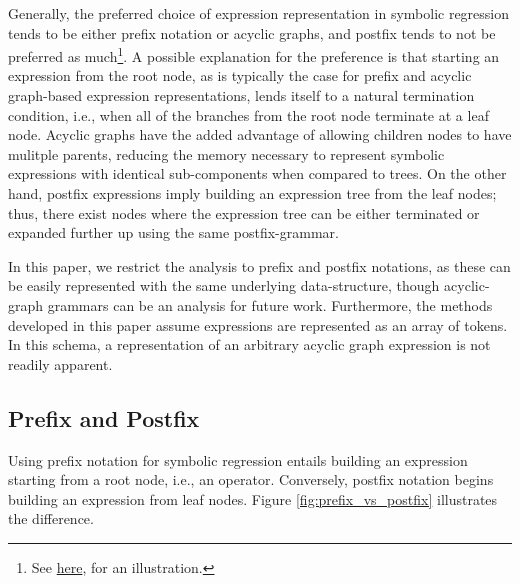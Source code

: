 \documentclass[runningheads]{llncs}
\begin{document}
Generally, the preferred choice of expression representation in symbolic regression tends to be either prefix notation or acyclic graphs, and postfix tends to not be preferred as much\footnote{See \href{https://github.com/edfink234/Alpha-Zero-Symbolic-Regression/blob/3f384098ef19681f2de23410cc1375b01ddb28b8/Figure_1/pub_freqs.pdf}{here}, for an illustration.}. A possible explanation for the preference is that starting an expression from the root node, as is typically the case for prefix and acyclic graph-based expression representations, lends itself to a natural termination condition, i.e., when all of the branches from the root node terminate at a leaf node. Acyclic graphs have the added advantage of allowing children nodes to have mulitple parents, reducing the memory necessary to represent symbolic expressions with identical sub-components when compared to trees. On the other hand, postfix expressions imply building an expression tree from the leaf nodes; thus, there exist nodes where the expression tree can be either terminated or expanded further up using the same postfix-grammar. 

In this paper, we restrict the analysis to prefix and postfix notations, as these can be easily represented with the same underlying data-structure, though acyclic-graph grammars can be an analysis for future work. Furthermore, the methods developed in this paper assume expressions are represented as an array of tokens. In this schema, a representation of an arbitrary acyclic graph expression is not readily apparent.


\subsection{Prefix and Postfix}
Using prefix notation for symbolic regression entails building an expression starting from a root node, i.e., an operator. Conversely, postfix notation begins building an expression from leaf nodes. Figure \ref{fig:prefix_vs_postfix} illustrates the difference.
\end{document}
